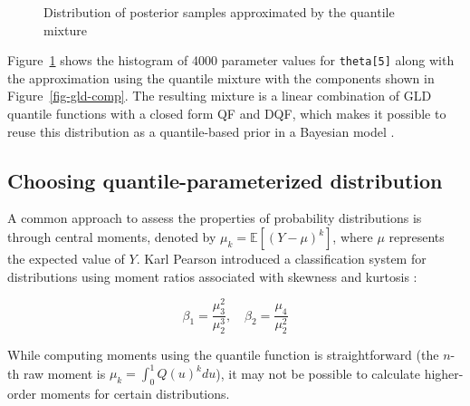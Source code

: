 \documentclass[
  fleqn,
  deca,
  blindrev
]{informs4}
\begin{document}
\begin{figure}


\caption{\label{fig-fitted-qm}Distribution of posterior samples
approximated by the quantile mixture}

\end{figure}%

Figure~\ref{fig-fitted-qm} shows the histogram of 4000 parameter values
for \texttt{theta{[}5{]}} along with the approximation using the
quantile mixture with the components shown in Figure~\ref{fig-gld-comp}.
The resulting mixture is a linear combination of GLD quantile functions
with a closed form QF and DQF, which makes it possible to reuse this
distribution as a quantile-based prior in a Bayesian model
\citep{perepolkin2023TenetsQuantilebasedInference}.

\subsection{Choosing quantile-parameterized
distribution}\label{sec-compareqf}

A common approach to assess the properties of probability distributions
is through central moments, denoted by \(\mu_k=\mathbb{E}[(Y-\mu)^k]\),
where \(\mu\) represents the expected value of \(Y\). Karl Pearson
introduced a classification system for distributions using moment ratios
associated with skewness and kurtosis
\citep{fiori2009KarlPearsonOrigin}:

\[
\beta_1=\frac{\mu_3^2}{\mu_2^3},\quad \beta_2=\frac{\mu_4}{\mu_2^2}
\]

While computing moments using the quantile function is straightforward
(the \(n\)-th raw moment is \(\mu_k=\int_0^1Q(u)^kdu\)), it may not be
possible to calculate higher-order moments for certain distributions.
\end{document}
